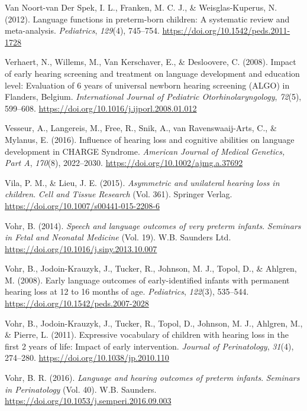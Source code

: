 \documentclass[english,man]{apa6}
\begin{document}
\leavevmode\hypertarget{ref-vannoort-vanderspek2012}{}%
Van Noort-van Der Spek, I. L., Franken, M. C. J., \& Weisglas-Kuperus, N. (2012). Language functions in preterm-born children: A systematic review and meta-analysis. \emph{Pediatrics}, \emph{129}(4), 745--754. \url{https://doi.org/10.1542/peds.2011-1728}

\leavevmode\hypertarget{ref-verhaert2008}{}%
Verhaert, N., Willems, M., Van Kerschaver, E., \& Desloovere, C. (2008). Impact of early hearing screening and treatment on language development and education level: Evaluation of 6 years of universal newborn hearing screening (ALGO) in Flanders, Belgium. \emph{International Journal of Pediatric Otorhinolaryngology}, \emph{72}(5), 599--608. \url{https://doi.org/10.1016/j.ijporl.2008.01.012}

\leavevmode\hypertarget{ref-vesseur2016}{}%
Vesseur, A., Langereis, M., Free, R., Snik, A., van Ravenswaaij-Arts, C., \& Mylanus, E. (2016). Influence of hearing loss and cognitive abilities on language development in CHARGE Syndrome. \emph{American Journal of Medical Genetics, Part A}, \emph{170}(8), 2022--2030. \url{https://doi.org/10.1002/ajmg.a.37692}

\leavevmode\hypertarget{ref-vila2015}{}%
Vila, P. M., \& Lieu, J. E. (2015). \emph{Asymmetric and unilateral hearing loss in children}. \emph{Cell and Tissue Research} (Vol. 361). Springer Verlag. \url{https://doi.org/10.1007/s00441-015-2208-6}

\leavevmode\hypertarget{ref-vohr2014}{}%
Vohr, B. (2014). \emph{Speech and language outcomes of very preterm infants}. \emph{Seminars in Fetal and Neonatal Medicine} (Vol. 19). W.B. Saunders Ltd. \url{https://doi.org/10.1016/j.siny.2013.10.007}

\leavevmode\hypertarget{ref-vohr2008}{}%
Vohr, B., Jodoin-Krauzyk, J., Tucker, R., Johnson, M. J., Topol, D., \& Ahlgren, M. (2008). Early language outcomes of early-identified infants with permanent hearing loss at 12 to 16 months of age. \emph{Pediatrics}, \emph{122}(3), 535--544. \url{https://doi.org/10.1542/peds.2007-2028}

\leavevmode\hypertarget{ref-vohr2011}{}%
Vohr, B., Jodoin-Krauzyk, J., Tucker, R., Topol, D., Johnson, M. J., Ahlgren, M., \& Pierre, L. (2011). Expressive vocabulary of children with hearing loss in the first 2 years of life: Impact of early intervention. \emph{Journal of Perinatology}, \emph{31}(4), 274--280. \url{https://doi.org/10.1038/jp.2010.110}

\leavevmode\hypertarget{ref-vohr2016}{}%
Vohr, B. R. (2016). \emph{Language and hearing outcomes of preterm infants}. \emph{Seminars in Perinatology} (Vol. 40). W.B. Saunders. \url{https://doi.org/10.1053/j.semperi.2016.09.003}
\end{document}
